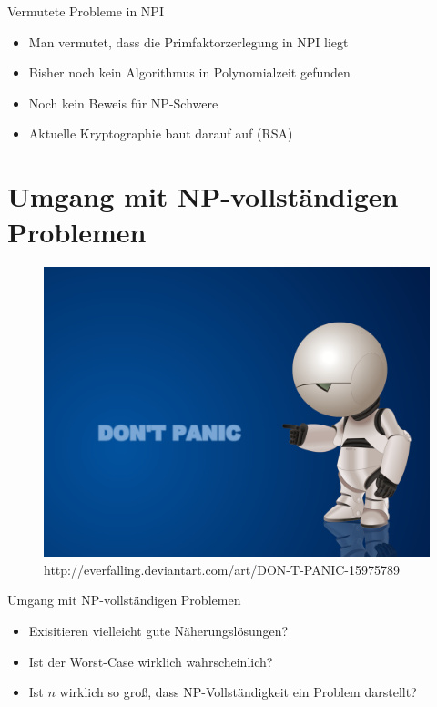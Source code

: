 \documentclass[ignorenonframetext,]{beamer}
\begin{document}
\begin{frame}{Vermutete Probleme in NPI}

\begin{itemize}
\itemsep1pt\parskip0pt
\item
  Man vermutet, dass die Primfaktorzerlegung in NPI liegt
\item
  Bisher noch kein Algorithmus in Polynomialzeit gefunden
\item
  Noch kein Beweis für NP-Schwere
\item
  Aktuelle Kryptographie baut darauf auf (RSA)
\end{itemize}

\end{frame}

\section{Umgang mit NP-vollständigen
Problemen}\label{umgang-mit-np-vollstuxe4ndigen-problemen}

\begin{frame}

\begin{figure}[htbp]
\centering
\includegraphics{img/dont_panic.png}
\caption{http://everfalling.deviantart.com/art/DON-T-PANIC-15975789}
\end{figure}

\end{frame}

\begin{frame}{Umgang mit NP-vollständigen Problemen}

\begin{itemize}
\itemsep1pt\parskip0pt
\item
  Exisitieren vielleicht gute Näherungslösungen?
\item
  Ist der Worst-Case wirklich wahrscheinlich?
\item
  Ist $n$ wirklich so groß, dass NP-Vollständigkeit ein Problem
  darstellt?
\end{itemize}

\end{frame}
\end{document}
